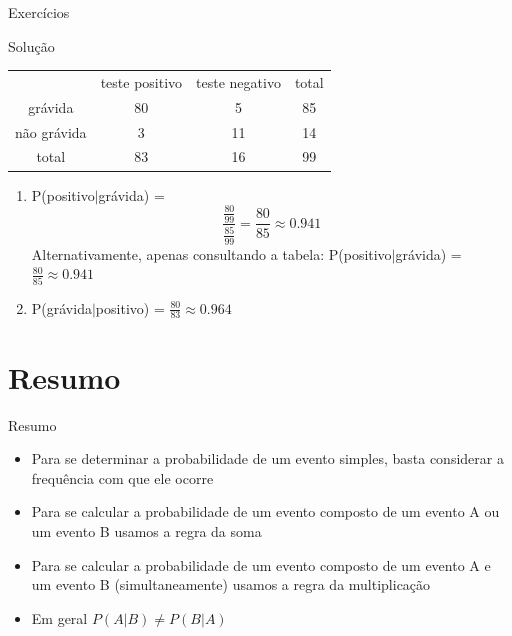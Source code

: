 \documentclass{beamer}
\begin{document}
\begin{frame}{Exercícios}
  \begin{block}{Solução}
    \begin{tabular}{ccc|c}
      & teste positivo & teste negativo & total\\
      grávida & 80 & 5 & 85\\
      não grávida & 3 & 11 & 14\\
      \hline
      total & 83 & 16 & 99\\
    \end{tabular}
    \begin{enumerate}
    \item P(positivo$|$grávida) = 
      \begin{displaymath}
        \frac{\frac{80}{99}}{\frac{85}{99}} = \frac{80}{85} \approx 0.941
      \end{displaymath}
      Alternativamente, apenas consultando a tabela:
      P(positivo$|$grávida) = $\frac{80}{85} \approx 0.941$

    \item P(grávida$|$positivo) = $\frac{80}{83} \approx 0.964$
    \end{enumerate}
  \end{block}
\end{frame}

\section{Resumo}

\begin{frame}{Resumo}
  \begin{itemize}
  \item Para se determinar a probabilidade de um evento simples, basta
    considerar a frequência com que ele ocorre
  \item Para se calcular a probabilidade de um evento composto de um
    evento A \alert{ou} um evento B usamos a regra da soma
  \item Para se calcular a probabilidade de um evento composto de um
    evento A \alert{e} um evento B (simultaneamente) usamos a regra da
    multiplicação
  \item Em geral $P(A|B) \neq P(B|A)$
  \end{itemize}
  
\end{frame}
\end{document}
